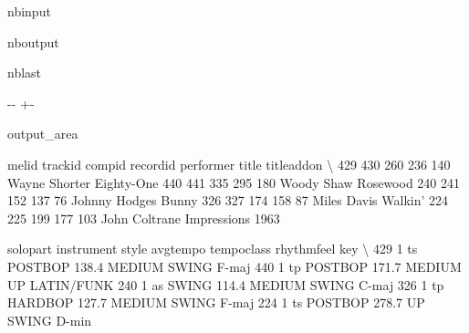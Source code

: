 \documentclass[letterpaper,10pt,english]{sphinxmanual}
\newlength\nbsphinxcodecellspacing
\begin{document}
\begin{sphinxuseclass}{nbinput}
{
\begin{sphinxVerbatim}[commandchars=\\\{\}]
\llap{\color{nbsphinxin}[13]:\,\hspace{\fboxrule}\hspace{\fboxsep}}
\end{sphinxVerbatim}
}

\end{sphinxuseclass}
\begin{sphinxuseclass}{nboutput}
\begin{sphinxuseclass}{nblast}
{

\kern-\sphinxverbatimsmallskipamount\kern-\baselineskip
\kern+\FrameHeightAdjust\kern-\fboxrule
\vspace{\nbsphinxcodecellspacing}

\begin{sphinxuseclass}{output_area}
\begin{sphinxuseclass}{}


\begin{sphinxVerbatim}[commandchars=\\\{\}]
\llap{\color{nbsphinxout}[13]:\,\hspace{\fboxrule}\hspace{\fboxsep}}     melid  trackid  compid  recordid      performer        title titleaddon  \textbackslash{}
429    430      260     236       140  Wayne Shorter   Eighty-One
440    441      335     295       180     Woody Shaw     Rosewood
240    241      152     137        76  Johnny Hodges        Bunny
326    327      174     158        87    Miles Davis      Walkin'
224    225      199     177       103  John Coltrane  Impressions       1963

     solopart instrument    style  avgtempo tempoclass  rhythmfeel    key  \textbackslash{}
429         1         ts  POSTBOP     138.4     MEDIUM       SWING  F-maj
440         1         tp  POSTBOP     171.7  MEDIUM UP  LATIN/FUNK
240         1         as    SWING     114.4     MEDIUM       SWING  C-maj
326         1         tp  HARDBOP     127.7     MEDIUM       SWING  F-maj
224         1         ts  POSTBOP     278.7         UP       SWING  D-min


\end{sphinxVerbatim}
\end{sphinxuseclass}
\end{sphinxuseclass}}
\end{sphinxuseclass}
\end{sphinxuseclass}
\end{document}
